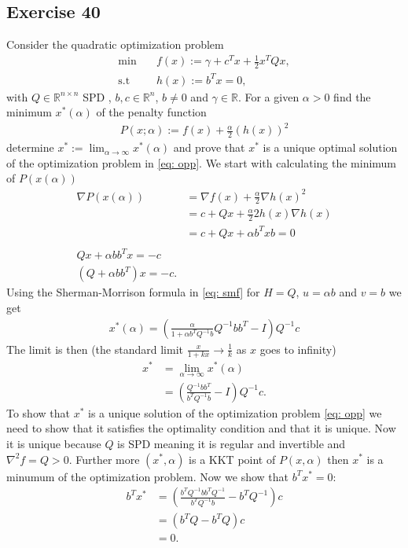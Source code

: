 \subsection{Exercise 40}
Consider the quadratic optimization problem
\begin{align}
    \min \quad &f(x):=\gamma + c^{T}x + \frac{1}{2}x^{T}Qx, \label{eq: opp}\\
    \text{s.t}\quad &h(x) := b^{T}x = 0, \nonumber
\end{align}
with $Q \in \mathbb{R}^{n \times n}$ SPD , $b, c \in \mathbb{R}^{n}$, $b\neq
0$ and $\gamma \in \mathbb{R}$. For a given $\alpha > 0$ find the minimum
$x^*(\alpha)$ of the penalty function
\begin{align}
    P(x;\alpha) := f(x) + \frac{\alpha}{2}\left( h(x) \right)^{2}
\end{align}
determine $x^* := \lim_{\alpha \to \infty}x^{*}(\alpha)$ and prove that
$x^{*}$ is a unique optimal solution of the optimization problem in \ref{eq:
opp}. We start with calculating the minimum of $P(x(\alpha))$
\begin{align}
    \nabla P(x(\alpha))
    &= \nabla f(x) + \frac{\alpha}{2}\nabla h(x)^{2}\\
    &= c + Qx + \frac{\alpha}{2} 2 h(x) \nabla h(x) \\
    &=c  + Qx + \alpha b^T x b = 0\\
    \nonumber\\
    Qx + \alpha b b ^T x = -c \\
    \left( Q + \alpha b b^T \right) x = -c.
\end{align}
Using the Sherman-Morrison formula in \ref{eq: smf} for $H = Q$, $u=\alpha
b$ and $v = b$ we get
\begin{align}
    x^{*}(\alpha) = \left( \frac{\alpha}{1+\alpha b^{T}Q^{-1}b}Q^{-1} bb^{T}
    -I\right) Q^{-1} c
\end{align}
The limit is then (the standard limit $\frac{x}{1+kx} \to \frac{1}{k}$ as $x$
goes to infinity)
\begin{align}
    x^{*} &= \lim_{\alpha \to \infty}x^{*}(\alpha)\\
          &= \left(\frac{Q^{-1}bb^{T}}{b^{T}Q^{-1}b} -I \right) Q^{-1} c.
\end{align}
To show that $x^{*}$ is a unique solution of the optimization problem
\ref{eq: opp} we need to show that it satisfies the optimality condition and
that it is unique. Now it is unique because $Q$ is SPD meaning it is regular
and invertible and $\nabla^2 f = Q>0$. Further more $(x^{*}, \alpha)$ is a
KKT point of $P(x, \alpha)$ then $x^{*}$ is a minumum of the optimization
problem. Now we show that $b^{T}x^{*} = 0$:
\begin{align}
    b^{T}x^{*} &= \left(\frac{b^{T}Q^{-1}bb^{T}Q^{-1}}{b^{T}Q^{-1}b}-
    b^{T}Q^{-1} \right) c \\
    &= \left( b^{T}Q - b^{T}Q \right) c \\
    &= 0.
\end{align}



